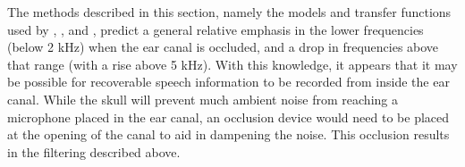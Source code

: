 




The methods described in this section, namely the models and transfer functions used by \cite{hansen:97b}, \cite{stenfelt:07}, and \cite{reinfeldt:10}, predict a general relative emphasis in the lower frequencies (below 2 kHz) when the ear canal is occluded, and a drop in frequencies above that range (with a rise above 5 kHz).  With this knowledge, it appears that it may be possible for recoverable speech information to be recorded from inside the ear canal.  While the skull will prevent much ambient noise from reaching a microphone placed in the ear canal, an occlusion device would need to be placed at the opening of the canal to aid in dampening the noise.  This occlusion results in the filtering described above.


